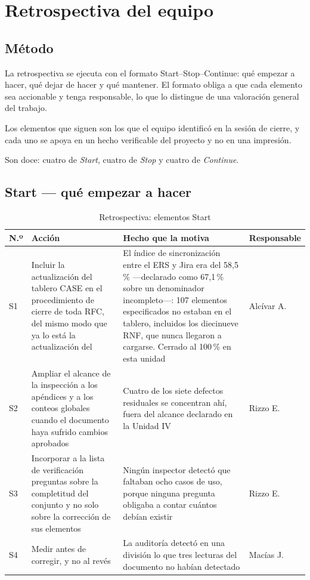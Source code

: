 \section{Retrospectiva del equipo}
\label{sec:retro}

\subsection{Método}

La retrospectiva se ejecuta con el formato Start--Stop--Continue: qué empezar a hacer, qué dejar de
hacer y qué mantener. El formato obliga a que cada elemento sea accionable y tenga responsable, lo
que lo distingue de una valoración general del trabajo.

Los elementos que siguen son los que el equipo identificó en la sesión de cierre, y cada uno se apoya
en un hecho verificable del proyecto y no en una impresión.

Son doce: cuatro de \emph{Start}, cuatro de \emph{Stop} y cuatro de \emph{Continue}.

\subsection{Start --- qué empezar a hacer}

\begin{table}[H]
\centering\footnotesize
\caption{Retrospectiva: elementos Start}
\label{tab:start}
\begin{tabular}{|C{1.2cm}|L{6.4cm}|L{4.4cm}|C{2.4cm}|}
\hline
{}\textbf{N.º} & \textbf{Acción} & \textbf{Hecho que la motiva} & \textbf{Responsable}\\ \hline
S1 & Incluir la actualización del tablero CASE en el procedimiento de cierre de toda RFC, del mismo modo que ya lo está la actualización del  & El índice de sincronización entre el ERS y Jira era del 58,5\,\% ---declarado como 67,1\,\% sobre un denominador incompleto---: 107 elementos especificados no estaban en el tablero, incluidos los diecinueve RNF, que nunca llegaron a cargarse. Cerrado al 100\,\% en esta unidad & Alcívar A.\\ \hline
S2 & Ampliar el alcance de la inspección a los apéndices y a los conteos globales cuando el documento haya sufrido cambios aprobados & Cuatro de los siete defectos residuales se concentran ahí, fuera del alcance declarado en la Unidad IV & Rizzo E.\\ \hline
S3 & Incorporar a la lista de verificación preguntas sobre la completitud del conjunto y no solo sobre la corrección de sus elementos & Ningún inspector detectó que faltaban ocho casos de uso, porque ninguna pregunta obligaba a contar cuántos debían existir & Rizzo E.\\ \hline
S4 & Medir antes de corregir, y no al revés & La auditoría detectó en una división lo que tres lecturas del documento no habían detectado & Macías J.\\ \hline
\end{tabular}
\end{table}

